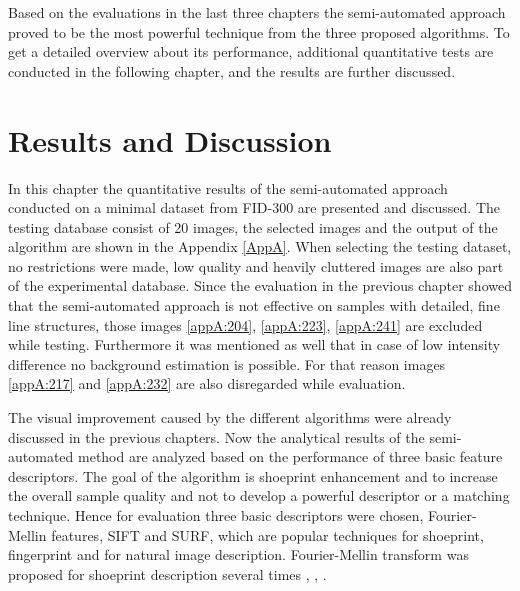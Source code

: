 \documentclass[draft,final]{vutinfth} %
\begin{document}
\par
Based on the evaluations in the last three chapters the semi-automated approach proved to be the most powerful technique from the three proposed algorithms.
To get a detailed overview about its performance, additional quantitative tests are conducted in the following chapter, and the results are further discussed.

\chapter{Results and Discussion}
\par
In this chapter the quantitative results of the semi-automated approach conducted on a minimal dataset from FID-300 are presented and discussed.
The testing database consist of 20 images, the selected images and the output of the algorithm are shown in the Appendix \ref{AppA}.
When selecting the testing dataset, no restrictions were made, low quality and heavily cluttered images are also part of the experimental database.
Since the evaluation in the previous chapter showed that the semi-automated approach is not effective on samples with detailed, fine line structures, those images \ref{appA:204}, \ref{appA:223}, \ref{appA:241} are excluded while testing.
Furthermore it was mentioned as well that in case of low intensity difference no background estimation is possible. For that reason images \ref{appA:217} and \ref{appA:232} are also disregarded while evaluation.
\par
The visual improvement caused by the different algorithms were already discussed in the previous chapters.
Now the analytical results of the semi-automated method are analyzed based on the performance of three basic feature descriptors.
The goal of the algorithm is shoeprint enhancement and to increase the overall sample quality and not to develop a powerful descriptor or a matching technique.
Hence for evaluation three basic descriptors were chosen, Fourier-Mellin features, SIFT and SURF, which are popular techniques for shoeprint, fingerprint and for natural image description.
Fourier-Mellin transform was proposed for shoeprint description several times \cite{gueham2008automatic}, \cite{richetelli2017classification}, \cite{wu2019crime}.
\end{document}

